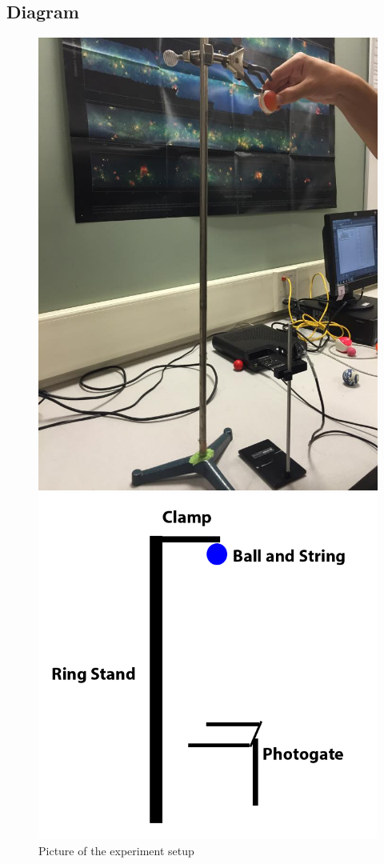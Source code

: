 \documentclass[10pt, letterpaper]{article}
\begin{document}
    \subsection{Diagram}
    \begin{figure}[!htb]
      \centering
      \parbox{2.75in} {
        \includegraphics[scale=0.233]{img/setup.jpg}
        \caption{Picture of the experiment setup}
      }
      \begin{minipage}{2.75in}
        \includegraphics[scale=0.7]{img/apparatus.png}

\end{minipage}
\end{figure}
\end{document}

